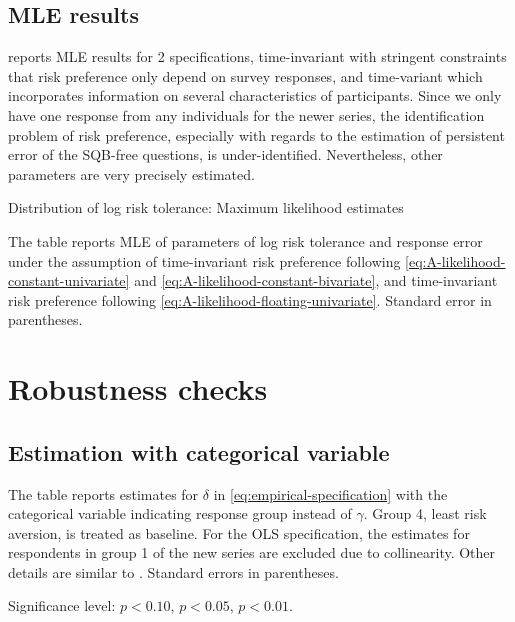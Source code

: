 \documentclass[emulatestandardclasses, 10pt, abstract = true]{scrartcl}
\begin{document}
\subsection{MLE results}

 reports MLE results for 2 specifications, time-invariant with stringent constraints that risk preference only depend on survey responses, and time-variant which incorporates information on several characteristics of participants. Since we only have one response from any individuals for the newer series, the identification problem of risk preference, especially with regards to the estimation of persistent error of the SQB-free questions, is under-identified. Nevertheless, other parameters are very precisely estimated.
\parskip 0cm
\begin{table}[!htbp]
	\centering \setlength{\extrarowheight}{0.3em}
	\caption{Distribution of log risk tolerance: Maximum likelihood estimates}
	\begin{threeparttable}
		
		\begin{tablenotes}[flushleft]\footnotesize
			\item The table reports MLE of parameters of log risk tolerance and response error under the assumption of time-invariant risk preference following \eqref{eq:A-likelihood-constant-univariate} and \eqref{eq:A-likelihood-constant-bivariate}, and time-invariant risk preference following \eqref{eq:A-likelihood-floating-univariate}. Standard error in parentheses.
		\end{tablenotes}
	\end{threeparttable}
	\label{table:appendix-mle}
\end{table}


\parskip 0cm

\pagebreak



\section{Robustness checks}
\subsection{Estimation with categorical variable}

\begin{ThreePartTable}
	\begin{TableNotes}[flushleft]\footnotesize
		\item \footnotesize The table reports estimates for $\delta$ in \eqref{eq:empirical-specification} with the categorical variable indicating response group instead of $\gamma$. Group 4, least risk aversion, is treated as baseline. For the OLS specification, the estimates for respondents in group 1 of the new series are excluded due to collinearity. Other details are similar to . Standard errors in parentheses.
		\item Significance level: \sym{*} \(p<0.10\), \sym{**} \(p<0.05\), \sym{***} \(p<0.01\).\\
	\end{TableNotes}
	
	\label{table:robust-1}
\end{ThreePartTable}
\end{document}
